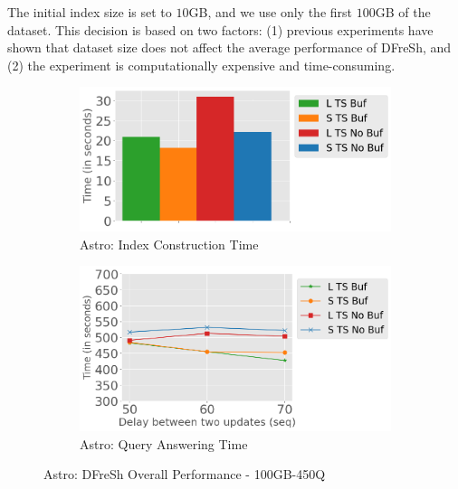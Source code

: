 The initial index size is set to $10$GB, and we use only the first $100$GB
of the dataset. This decision is based on two factors: (1) previous experiments
have shown that dataset size does not affect the average performance of DFreSh,
and (2) the experiment is computationally expensive and time-consuming.


\begin{figure}
	\centering
	\begin{subfigure}[c]{0.48\textwidth}
		\includegraphics[width=1\textwidth]   {figures/Experiments/Dynamic/ASTRO/index_construction_astro.png}
		\caption{Astro: Index Construction Time}
		\label{fig:actual-index-Construction-time-astro}
	\end{subfigure}
	\begin{subfigure}[c]{0.48\textwidth}
		\includegraphics[width=1\textwidth]	 {figures/Experiments/Dynamic/ASTRO/astro_query_answering_xaxis.png}
		\caption{Astro: Query Answering Time}
		\label{fig:actual-query-answering-time-astro}
	\end{subfigure}
	\caption{Astro: DFreSh Overall Performance - 100GB-450Q}
	\label{fig:dfresh-performance-astro}
\end{figure}

